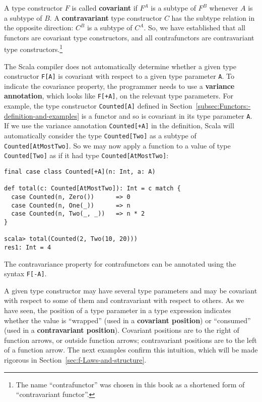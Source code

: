 A type constructor $F$ is called \textbf{covariant}
if $F^{A}$ is a subtype of $F^{B}$ whenever $A$ is a subtype of
$B$. A \textbf{contravariant}
type constructor $C$ has the subtype relation in the opposite direction:
$C^{B}$ is a subtype of $C^{A}$. So, we have established that all
functors are covariant type constructors, and all contrafunctors are
contravariant type constructors.\footnote{The name ``contrafunctor'' was chosen in this book as a shortened
form of ``contravariant functor''.} 

The Scala compiler does not automatically determine whether a given
type constructor \lstinline!F[A]! is covariant with respect to a
given type parameter \lstinline!A!. To indicate the covariance property,
the programmer needs to use a \textbf{variance
annotation}, which looks like \lstinline!F[+A]!, on the relevant
type parameters. For example, the type constructor \lstinline!Counted[A]!
defined in Section~\ref{subsec:Functors:-definition-and-examples}
is a functor and so is covariant in its type parameter \lstinline!A!.
If we use the variance annotation \lstinline!Counted[+A]! in the
definition, Scala will automatically consider the type \lstinline!Counted[Two]!
as a subtype of \lstinline!Counted[AtMostTwo]!. So we may now apply
a function to a value of type \lstinline!Counted[Two]! as if it had
type \lstinline!Counted[AtMostTwo]!:
\begin{lstlisting}
final case class Counted[+A](n: Int, a: A)

def total(c: Counted[AtMostTwo]): Int = c match {
  case Counted(n, Zero())      => 0
  case Counted(n, One(_))      => n
  case Counted(n, Two(_, _))   => n * 2
}

scala> total(Counted(2, Two(10, 20)))
res1: Int = 4
\end{lstlisting}

The contravariance property for contrafunctors can be annotated using
the syntax \lstinline!F[-A]!.

A given type constructor may have several type parameters and may
be covariant with respect to some of them and contravariant with respect
to others. As we have seen, the position of a type parameter in a
type expression indicates whether the value is ``wrapped'' (used
in a \textbf{covariant position}) or ``consumed''
(used in a \textbf{contravariant position}).
Covariant positions are to the right of function arrows, or outside
function arrows; contravariant positions are to the left of a function
arrow. The next examples confirm this intuition, which will be made
rigorous in Section~\ref{sec:f-Laws-and-structure}.

